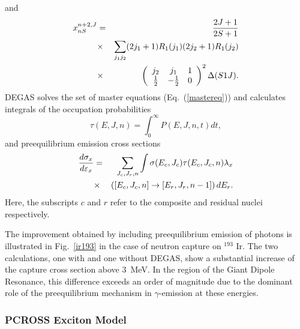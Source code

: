 and
\begin{eqnarray}
x_{nS}^{n+2,J}&=&\frac{2J+1}{2S+1}  \notag \\
&\times&\sum_{j_{1}j_{2}}(2j_{1}+1)R_{1}(j_{1})(2j_{2}+1)R_{1}(j_{2})  \notag
\\
&\times&\left(%
\begin{array}{ccc}
j_{2} & j_{1} & 1 \\
\frac{1}{2} & -\frac{1}{2} & 0%
\end{array}%
\right)^{2}\Delta(S1J).
\end{eqnarray}
DEGAS%
 solves the set of master equations (Eq.~(\ref{mastereq})) and
calculates integrals of the occupation probabilities
\begin{equation}
\tau(E,J,n)=\int_{0}^{\infty}P(E,J,n,t)dt,
\end{equation}
and preequilibrium emission cross sections
\begin{eqnarray}
\frac{d\sigma_{x}}{d\varepsilon_{x}}&=&\sum_{J_{c},J_{r},n}\int%
\sigma(E_{c},J_{c})\tau(E_{c},J_{c},n)\lambda_{x}  \notag \\
&\times&\left(\left[E_{c},J_{c},n\right]\rightarrow\left[E_{r},J_{r},n-1%
\right]\right)dE_{r}.
\end{eqnarray}
Here, the subscripts $c$ and $r$ refer to the composite and residual nuclei
respectively.

The improvement obtained by including preequilibrium emission of photons is
illustrated in Fig.~\ref{ir193} in the case of neutron capture on $^{193}$%
Ir. The two calculations, one with and one without DEGAS, show a substantial
increase of the capture cross section above 3~MeV. In the region of the
Giant Dipole Resonance, this difference exceeds an order of magnitude due to
the dominant role of the preequilibrium mechanism in $\gamma$-emission
at these energies.

\subsubsection{PCROSS Exciton Model \label{PCROSS}}


